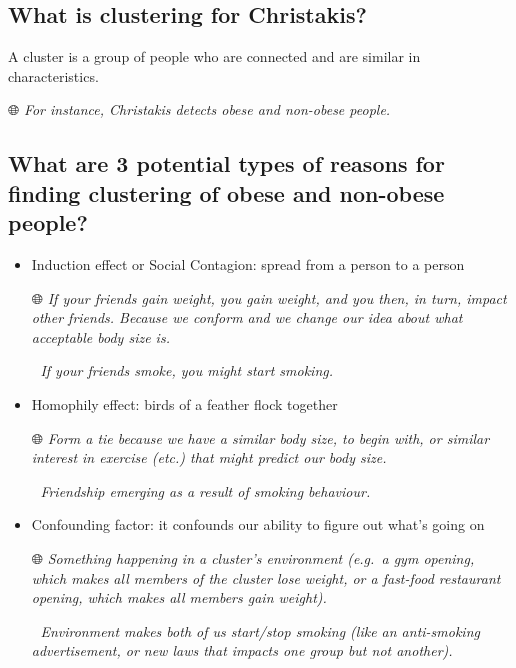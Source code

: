 \documentclass[
  notitlepage,
  onecolumn,
  openany]{book}
\begin{document}
\hypertarget{what-is-clustering-for-christakis}{%
\subsection{What is clustering for Christakis?}\label{what-is-clustering-for-christakis}}

A cluster is a group of people who are connected and are similar in characteristics.

🌐 \emph{For instance, Christakis detects obese and non-obese people.}

\hypertarget{what-are-3-potential-types-of-reasons-for-finding-clustering-of-obese-and-non-obese-people}{%
\subsection{What are 3 potential types of reasons for finding clustering of obese and non-obese people?}\label{what-are-3-potential-types-of-reasons-for-finding-clustering-of-obese-and-non-obese-people}}

\begin{itemize}
\item
  Induction effect or Social Contagion: spread from a person to a person

  🌐 \emph{If your friends gain weight, you gain weight, and you then, in turn, impact other friends. Because we conform and we change our idea about what acceptable body size is.}

  🚬 \emph{If your friends smoke, you might start smoking.}
\item
  Homophily effect: birds of a feather flock together

  🌐 \emph{Form a tie because we have a similar body size, to begin with, or similar interest in exercise (etc.) that might predict our body size.}

  🚬 \emph{Friendship emerging as a result of smoking behaviour.}
\item
  Confounding factor: it confounds our ability to figure out what's going on

  🌐 \emph{Something happening in a cluster's environment (e.g.~a gym opening, which makes all members of the cluster lose weight, or a fast-food restaurant opening, which makes all members gain weight).}

  🚬 \emph{Environment makes both of us start/stop smoking (like an anti-smoking advertisement, or new laws that impacts one group but not another).}
\end{itemize}
\end{document}
